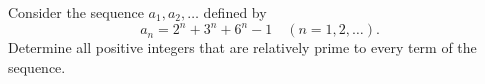 Consider the sequence $a_1, a_2, \ldots$ defined by
\[ a_n = 2^n + 3^n + 6^n - 1 \quad (n = 1, 2, \ldots). \]
Determine all positive integers that are relatively prime to every term of the sequence.
